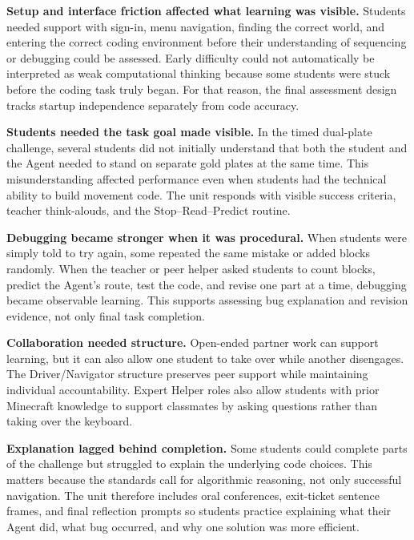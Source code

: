 \documentclass[12pt]{article}
\begin{document}
\textbf{Setup and interface friction affected what learning was visible.} Students needed support with sign-in, menu navigation, finding the correct world, and entering the correct coding environment before their understanding of sequencing or debugging could be assessed. Early difficulty could not automatically be interpreted as weak computational thinking because some students were stuck before the coding task truly began. For that reason, the final assessment design tracks startup independence separately from code accuracy.

\textbf{Students needed the task goal made visible.} In the timed dual-plate challenge, several students did not initially understand that both the student and the Agent needed to stand on separate gold plates at the same time. This misunderstanding affected performance even when students had the technical ability to build movement code. The unit responds with visible success criteria, teacher think-alouds, and the Stop--Read--Predict routine.

\textbf{Debugging became stronger when it was procedural.} When students were simply told to try again, some repeated the same mistake or added blocks randomly. When the teacher or peer helper asked students to count blocks, predict the Agent's route, test the code, and revise one part at a time, debugging became observable learning. This supports assessing bug explanation and revision evidence, not only final task completion.

\textbf{Collaboration needed structure.} Open-ended partner work can support learning, but it can also allow one student to take over while another disengages. The Driver/Navigator structure preserves peer support while maintaining individual accountability. Expert Helper roles also allow students with prior Minecraft knowledge to support classmates by asking questions rather than taking over the keyboard.

\textbf{Explanation lagged behind completion.} Some students could complete parts of the challenge but struggled to explain the underlying code choices. This matters because the standards call for algorithmic reasoning, not only successful navigation. The unit therefore includes oral conferences, exit-ticket sentence frames, and final reflection prompts so students practice explaining what their Agent did, what bug occurred, and why one solution was more efficient.
\end{document}
